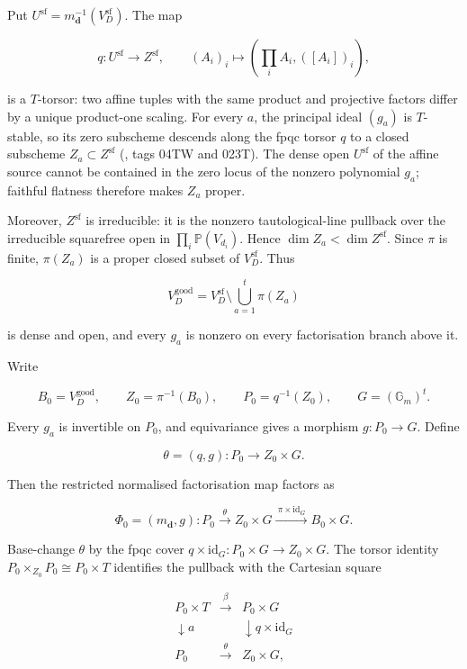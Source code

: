 \documentclass[
  11pt,
  a4paper,
]{article}
\begin{document}
Put \(U^{\mathrm{sf}}=m_{\mathbf d}^{-1}(V_D^{\mathrm{sf}})\). The map

\[
 q:U^{\mathrm{sf}}\longrightarrow Z^{\mathrm{sf}},\qquad
 (A_i)_i\longmapsto\left(\prod_iA_i,([A_i])_i\right),
\]

is a \(T\)-torsor: two affine tuples with the same product and
projective factors differ by a unique product-one scaling. For every
\(a\), the principal ideal \((g_a)\) is \(T\)-stable, so its zero
subscheme descends along the fpqc torsor \(q\) to a closed subscheme
\(Z_a\subset Z^{\mathrm{sf}}\) (, tags 04TW and 023T). The dense open
\(U^{\mathrm{sf}}\) of the affine source cannot be contained in the zero
locus of the nonzero polynomial \(g_a\); faithful flatness therefore
makes \(Z_a\) proper.

Moreover, \(Z^{\mathrm{sf}}\) is irreducible: it is the nonzero
tautological-line pullback over the irreducible squarefree open in
\(\prod_i\mathbb P(V_{d_i})\). Hence \(\dim Z_a<\dim Z^{\mathrm{sf}}\).
Since \(\pi\) is finite, \(\pi(Z_a)\) is a proper closed subset of
\(V_D^{\mathrm{sf}}\). Thus

\[
 V_D^{\mathrm{good}}
 =V_D^{\mathrm{sf}}\setminus\bigcup_{a=1}^t\pi(Z_a)
\]

is dense and open, and every \(g_a\) is nonzero on every factorisation
branch above it.

Write

\[
 B_0=V_D^{\mathrm{good}},\qquad
 Z_0=\pi^{-1}(B_0),\qquad
 P_0=q^{-1}(Z_0),\qquad
 G=(\mathbb G_m)^t.
\]

Every \(g_a\) is invertible on \(P_0\), and equivariance gives a
morphism \(g:P_0\to G\). Define

\[
 \theta=(q,g):P_0\longrightarrow Z_0\times G.
\]

Then the restricted normalised factorisation map factors as

\[
 \Phi_0=(m_{\mathbf d},g):P_0
 \xrightarrow{\ \theta\ }Z_0\times G
 \xrightarrow{\ \pi\times\mathrm{id}_G\ }B_0\times G.
\tag{8.2}
\]

Base-change \(\theta\) by the fpqc cover
\(q\times\mathrm{id}_G:P_0\times G\to Z_0\times G\). The torsor identity
\(P_0\times_{Z_0}P_0\cong P_0\times T\) identifies the pullback with the
Cartesian square

\[
\begin{array}{ccc}
 P_0\times T&\xrightarrow{\ \beta\ }&P_0\times G\\[1mm]
 \downarrow{a}&&\downarrow{q\times\mathrm{id}_G}\\[1mm]
 P_0&\xrightarrow{\ \theta\ }&Z_0\times G,
\end{array}
\tag{8.3}
\]
\end{document}
